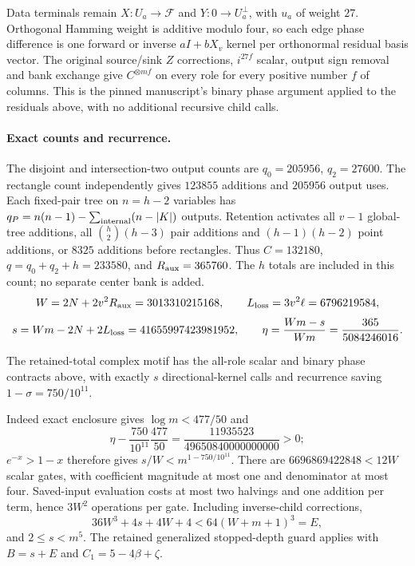Data terminals remain $X:U_a\to\mathcal F$ and $Y:0\to U_a^\perp$,
with $u_a$ of weight $27$. Orthogonal Hamming weight is additive modulo four,
so each edge phase difference is one forward or inverse $aI+bX_v$ kernel
per orthonormal residual basis vector. The original source/sink $Z$ corrections,
$i^{27f}$ scalar, output sign removal and bank exchange give
$C^{\otimes mf}$ on every role for every positive number $f$ of columns.
This is the pinned manuscript's binary phase argument applied to the residuals
above, with no additional recursive child calls.

\paragraph{Exact counts and recurrence.}
The disjoint and intersection-two output counts are $q_0=205956$, $q_2=27600$.
The rectangle count independently gives $123855$ additions and $205956$
output uses. Each fixed-pair tree on $n=h-2$ variables has
$q_P=n(n-1)-\sum_{\rm internal}(n-|K|)$ outputs.
Retention activates all $v-1$ global-tree additions, all
$\binom h2(h-3)$ pair additions and $(h-1)(h-2)$ point additions, or $8325$
additions before rectangles. Thus $C=132180$,
$q=q_0+q_2+h=233580$, and $R_{\rm aux}=365760$.
The $h$ totals are included in this count; no separate center bank is added.
\[
 W=2N+2v^2R_{\rm aux}=3013310215168,\qquad
 L_{\rm loss}=3v^2\ell=6796219584,
\]
\[
 s=Wm-2N+2L_{\rm loss}=41655997423981952,\qquad
 \eta=\frac{Wm-s}{Wm}=\frac{365}{5084246016}.
\]
\begin{proposition}\label{prop:retained-tree-complex-interface}
The retained-total complex motif has the all-role scalar and binary phase
contracts above, with exactly $s$ directional-kernel calls and recurrence
saving $1-\sigma=750/10^{11}$.
\end{proposition}
Indeed exact enclosure gives $\log m<477/50$ and
\[
 \eta-\frac{750}{10^{11}}\frac{477}{50}
 =\frac{11935523}{49650840000000000}>0;
\]
$e^{-x}>1-x$ therefore gives $s/W<m^{1-750/10^{11}}$.
There are $6696869422848<12W$ scalar gates, with coefficient magnitude at most
one and denominator at most four. Saved-input evaluation costs at most two
halvings and one addition per term, hence $3W^2$ operations per gate.
Including inverse-child corrections,
\[
 36W^3+4s+4W+4<64(W+m+1)^3=E,
\]
and $2\le s<m^5$. The retained generalized stopped-depth guard applies with
$B=s+E$ and $C_1=5-4\beta+\zeta$.

